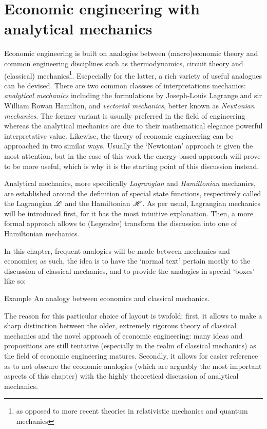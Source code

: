 \chapter{Economic engineering with analytical mechanics}
\label{chap:ee}
Economic engineering is built on analogies between (macro)economic theory and common engineering disciplines such as thermodynamics, circuit theory and (classical) mechanics\footnote{as opposed to more recent theories in relativistic mechanics and quantum mechanics}. Escpecially for the latter, a rich variety of useful analogues can be devised. There are two common classses of interpretations mechanics: \emph{analytical mechanics} including the formulations by Joseph-Louis Lagrange and sir William Rowan Hamilton, and \emph{vectorial mechanics}, better known as \emph{Newtonian mechanics}. The former variant is usually preferred in the field of engineering whereas the analytical mechanics are due to their mathematical elegance powerful interpretative value. Likewise, the theory of economic engineering can be approached in two similar ways. Usually the `Newtonian' approach is given the most attention, but in the case of this work the energy-based approach will prove to be more useful, which is why it is the starting point of this discussion instead.

Analytical mechanics, more specifically \emph{Lagrangian} and \emph{Hamiltonian} mechanics, are established around the definition of special state functions, respectively called the Lagrangian \(\mathscr{L}\) and the Hamiltonian \(\mathscr{H}\). As per usual, Lagrangian mechanics will be introduced first, for it has the most intuitive explanation. Then, a more formal approach allows to (Legendre) transform the discussion into one of Hamiltonian mechanics. 

In this chapter, frequent analogies will be made between mechanics and economics; as such, the idea is to have the `normal text' pertain mostly to the discussion of classical mechanics, and to provide the analogies in special `boxes' like so:
\begin{econ}{Example}
    An analogy between economics and classical mechanics.
\end{econ}
The reason for this particular choice of layout is twofold: first, it allows to make a sharp distinction between the older, extremely rigorous theory of classical mechanics and the novel approach of economic engineering: many ideas and propositions are still tentative (especially in the realm of classical mechanics) as the field of economic engineering matures. Secondly, it allows for easier reference as to not obscure the economic analogies (which are arguably the most important aspects of this chapter) with the highly theoretical discussion of analytical mechanics.
